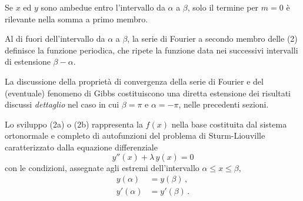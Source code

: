 \documentclass[11pt, a4paper]{book}
\numberwithin{equation}{section}
\begin{document}
Se $x$ ed $y$ sono ambedue entro l'intervallo da $\alpha$ a $\beta$, solo il termine per $m=0$ è rilevante nella somma a primo membro.

Al di fuori dell'intervallo da $\alpha$ a $\beta$, la serie di Fourier a secondo membro delle (2) definisce la funzione periodica, che ripete la funzione data nei successivi intervalli di estensione $\beta-\alpha$.

La discussione della proprietà di convergenza della serie di Fourier e del (eventuale) fenomeno di Gibbs costituiscono una diretta estensione dei risultati discussi \textit{dettaglio} nel caso in cui $\beta=\pi$ e $\alpha=-\pi$, nelle precedenti sezioni.

Lo sviluppo (2a) o (2b) rappresenta la $f(x)$ nella base costituita dal sistema ortonormale e completo di autofunzioni del problema di Sturm-Liouville caratterizzato dalla equazione differenziale
\begin{equation}
  y''(x) + \lambda\,y(x) = 0 \tag{7}
\end{equation}
con le condizioni, assegnate agli estremi dell'intervallo $\alpha \leq x \leq \beta$,
\begin{align}
  y(\alpha) &= y(\beta)\,, \tag{8a}\\
  y'(\alpha) &= y'(\beta)\,. \tag{8b}
\end{align}
\end{document}
